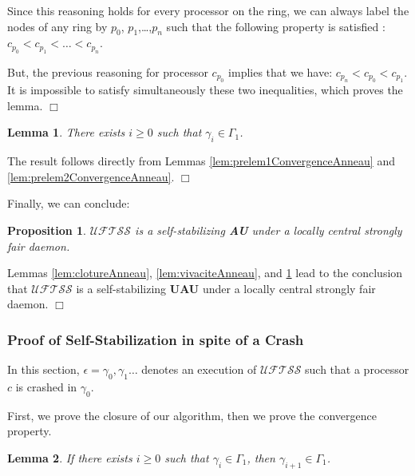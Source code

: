 \documentclass[11pt,english,letterpaper]{article}
\newtheorem{lemma}{Lemma}
\newtheorem{proposition}{Proposition}
\newenvironment{proof}{{\noindent\bf Proof. } }{{\hfill $\Box$}}
\begin{document}
\begin{proof}
Since this reasoning holds for every processor on the ring, we can always label the nodes of any ring by $p_{0}$, $p_{1}$,\ldots,$p_{n}$ such that the following property is satisfied : $c_{p_{0}}<c_{p_{1}}<\ldots<c_{p_{n}}$.

But, the previous reasoning for processor $c_{p_{0}}$ implies that we have: $c_{p_{n}}<c_{p_{0}}<c_{p_{1}}$. It is impossible to satisfy simultaneously these two inequalities, which proves the lemma.
\end{proof}

\begin{lemma}\label{lem:convergenceAnneau}
There exists $i\geq 0$ such that $\gamma_{i}\in\Gamma_{1}$.
\end{lemma}

\begin{proof}
The result follows directly from Lemmas \ref{lem:prelem1ConvergenceAnneau} and \ref{lem:prelem2ConvergenceAnneau}.
\end{proof}
	
Finally, we can conclude:
		
\begin{proposition}\label{prop:SSAnneau}
$\mathcal{UFTSS}$ is a self-stabilizing \textbf{AU} under a locally central strongly fair daemon.
\end{proposition}

\begin{proof}
Lemmas \ref{lem:clotureAnneau}, \ref{lem:vivaciteAnneau}, and \ref{lem:convergenceAnneau} lead to the conclusion that $\mathcal{UFTSS}$ is a self-stabilizing \textbf{UAU} under a locally central strongly fair daemon.
\end{proof}
		
\subsubsection{Proof of Self-Stabilization in spite of a Crash}
	
In this section, $\epsilon=\gamma_{0},\gamma_{1}\ldots$ denotes an execution of $\mathcal{UFTSS}$ such that a processor $c$ is crashed in $\gamma_{0}$.

First, we prove the closure of our algorithm, then we prove the convergence property.

\begin{lemma}\label{lem:clotureCrashAnneau}
If there exists $i\geq 0$ such that $\gamma_{i}\in \Gamma_{1}$, then $\gamma_{i+1}\in\Gamma_{1}$.
\end{lemma}
\end{document}
